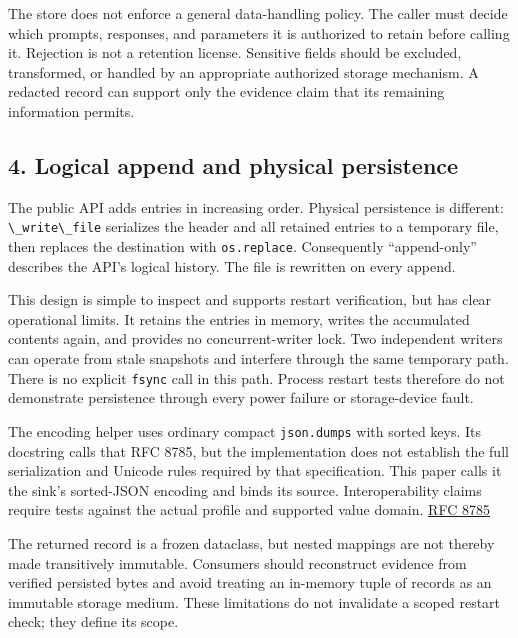 \documentclass[
  11pt,
]{article}
\newcommand{\passthrough}[1]{#1}
\begin{document}
The store does not enforce a general data-handling policy. The caller
must decide which prompts, responses, and parameters it is authorized to
retain before calling it. Rejection is not a retention license.
Sensitive fields should be excluded, transformed, or handled by an
appropriate authorized storage mechanism. A redacted record can support
only the evidence claim that its remaining information permits.

\subsection{4. Logical append and physical
persistence}\label{logical-append-and-physical-persistence}

The public API adds entries in increasing order. Physical persistence is
different: \passthrough{\lstinline!\_write\_file!} serializes the header
and all retained entries to a temporary file, then replaces the
destination with \passthrough{\lstinline!os.replace!}. Consequently
``append-only'' describes the API's logical history. The file is
rewritten on every append.

This design is simple to inspect and supports restart verification, but
has clear operational limits. It retains the entries in memory, writes
the accumulated contents again, and provides no concurrent-writer lock.
Two independent writers can operate from stale snapshots and interfere
through the same temporary path. There is no explicit
\passthrough{\lstinline!fsync!} call in this path. Process restart tests
therefore do not demonstrate persistence through every power failure or
storage-device fault.

The encoding helper uses ordinary compact
\passthrough{\lstinline!json.dumps!} with sorted keys. Its docstring
calls that RFC 8785, but the implementation does not establish the full
serialization and Unicode rules required by that specification. This
paper calls it the sink's sorted-JSON encoding and binds its source.
Interoperability claims require tests against the actual profile and
supported value domain.
\href{https://www.rfc-editor.org/rfc/rfc8785.html}{RFC 8785}

The returned record is a frozen dataclass, but nested mappings are not
thereby made transitively immutable. Consumers should reconstruct
evidence from verified persisted bytes and avoid treating an in-memory
tuple of records as an immutable storage medium. These limitations do
not invalidate a scoped restart check; they define its scope.
\end{document}
